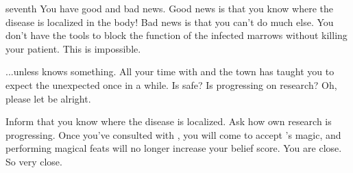 \documentclass[greennotebook]{Pestilence} %
\begin{document}
\begin{page}{seventh}
You have good and bad news. Good news is that you know where the disease is localized in the body! Bad news is that you can't do much else. You don't have the tools to block the function of the infected marrows without killing your patient. This is impossible. 

...unless \cRebel{} knows something. All your time with \cRebel{\them} and the town has taught you to expect the unexpected once in a while. Is \cRebel{} safe? Is \cRebel{\they} progressing on \cRebel{\their} research? Oh, please let \cRebel{\them} be alright.

Inform \cRebel{} that you know where the disease is localized. Ask \cRebel{\them} how \cRebel{\their} own research is progressing. Once you've consulted with \cRebel{\them}, you will come to accept \cRebel{}'s magic, and \cRebel{\them} performing magical feats will no longer increase your belief score. You are close. So very close.

\end{page}

\endnotebook
\end{document}
